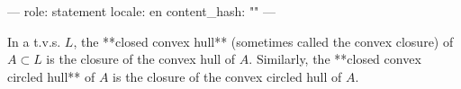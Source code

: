 ---
role: statement
locale: en
content_hash: ""
---

In a t.v.s. $L$, the **closed convex hull** (sometimes called the convex closure) of $A \subset L$ is the closure of the convex hull of $A$. Similarly, the **closed convex circled hull** of $A$ is the closure of the convex circled hull of $A$.
